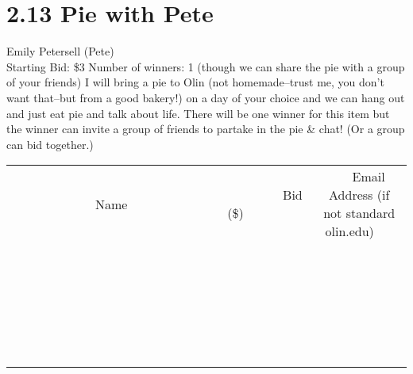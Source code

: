 \documentclass[11pt]{article}
\begin{document}
\section*{2.13 Pie with Pete}
Emily Petersell (Pete)
\\
Starting Bid: \$3
\newline
Number of winners: 1 (though we can share the pie with a group of your friends)
\newline
I will bring a pie to Olin (not homemade--trust me, you don't want that--but from a good bakery!) on a day of your choice and we can hang out and just eat pie and talk about life. There will be one winner for this item but the winner can invite a group of friends to partake in the pie \& chat! (Or a group can bid together.)
\\[6ex]
\begin{tabular}{c c c}
~~~~~~~~~~~~~Name~~~~~~~~~~~~~ & ~~~~~~~~~Bid (\$)~~~~~~~~~  & ~~~Email Address (if not standard olin.edu)~~~\\
 & & \\
\hline
 & & \\
\hline
 & & \\
\hline
 & & \\
\hline
 & & \\
\hline
 & & \\
\hline
 & & \\
\hline
 & & \\
\hline
 & & \\
\hline
 & & \\
\hline
 & & \\
\hline
 & & \\
\hline
 & & \\
\hline
 & & \\
\hline
 & & \\
\hline
 & & \\
\hline
 & & \\
\hline
 & & \\
\hline
 & & \\
\hline
 & & \\
\hline
 & & \\
\hline
 & & \\
\hline
 & & \\
\hline
 & & \\
\hline
 & & \\
\hline
 & & \\
\hline
\end{tabular}
\newpage
\end{document}

